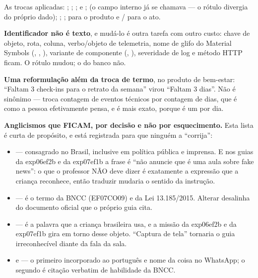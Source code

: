 As trocas aplicadas:  \seta{} ; 
\seta{} ;  \seta{} ;  e  \seta{} ; 
\seta{}  (o campo interno já se chamava  --- o rótulo
divergia do próprio dado);  \seta{} ; 
\seta{} ;  \seta{}  para o produto
e  /  para o ato.

\textbf{Identificador não é texto}, e mudá-lo é outra tarefa com outro custo:
chave de objeto, rota, coluna, verbo/objeto de telemetria, nome de glifo do
Material Symbols (, , ), variante de
componente (, ), severidade de log e método HTTP ficam.
O rótulo  mudou; o
 do banco não.

\textbf{Uma reformulação além da troca de termo}, no produto de bem-estar:
\enquote{Faltam 3 check-ins para o retrato da semana} virou \enquote{Faltam 3
dias}. Não é sinônimo --- troca contagem de eventos técnicos por contagem de
dias, que é como a pessoa efetivamente pensa, e é mais exato, porque é um por
dia.

\textbf{Anglicismos que FICAM, por decisão e não por esquecimento.} Esta lista é
curta de propósito, e está registrada para que ninguém a \enquote{corrija}:

\begin{itemize}
  \item {} --- consagrado no Brasil, inclusive em política pública e
    imprensa. E nos guias da exp06ef2b e da exp07ef1b a frase é \enquote{não anuncie
    que é uma aula sobre fake news}: o que o professor NÃO deve dizer é
    exatamente a expressão que a criança reconhece, então traduzir mudaria o
    sentido da instrução.
  \item {} --- é o termo da BNCC (EF07CO09) e da Lei
    13.185/2015. Alterar desalinha do documento oficial que o próprio guia cita.
  \item {} --- é a palavra que a criança brasileira usa, e a missão da
    exp06ef2b e da exp07ef1b gira em torno desse objeto. \enquote{Captura de tela}
    tornaria o guia irreconhecível diante da fala da sala.
  \item {} e  --- o primeiro incorporado ao português e nome
    da coisa no WhatsApp; o segundo é citação verbatim de habilidade da BNCC.
\end{itemize}

